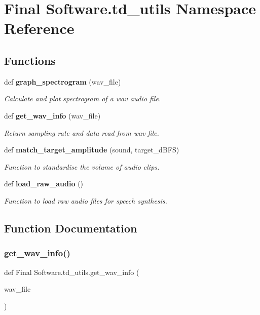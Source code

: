 \section{Final Software.\+td\+\_\+utils Namespace Reference}
\label{namespace_final_01_software_1_1td__utils}
\subsection*{Functions}
\begin{DoxyCompactItemize}
\item 
def \textbf{ graph\+\_\+spectrogram} (wav\+\_\+file)
\begin{DoxyCompactList}\small\item\em Calculate and plot spectrogram of a wav audio file. \end{DoxyCompactList}\item 
def \textbf{ get\+\_\+wav\+\_\+info} (wav\+\_\+file)
\begin{DoxyCompactList}\small\item\em Return sampling rate and data read from wav file. \end{DoxyCompactList}\item 
def \textbf{ match\+\_\+target\+\_\+amplitude} (sound, target\+\_\+d\+B\+FS)
\begin{DoxyCompactList}\small\item\em Function to standardise the volume of audio clips. \end{DoxyCompactList}\item 
def \textbf{ load\+\_\+raw\+\_\+audio} ()
\begin{DoxyCompactList}\small\item\em Function to load raw audio files for speech synthesis. \end{DoxyCompactList}\end{DoxyCompactItemize}


\subsection{Function Documentation}
\mbox{\label{namespace_final_01_software_1_1td__utils_a8069092b9e344f0dc8e835fba517c602}} 
\subsubsection{get\_wav\_info()}
{\footnotesize\ttfamily def Final Software.\+td\+\_\+utils.\+get\+\_\+wav\+\_\+info (\begin{DoxyParamCaption}\item[{}]{wav\+\_\+file }\end{DoxyParamCaption})}



